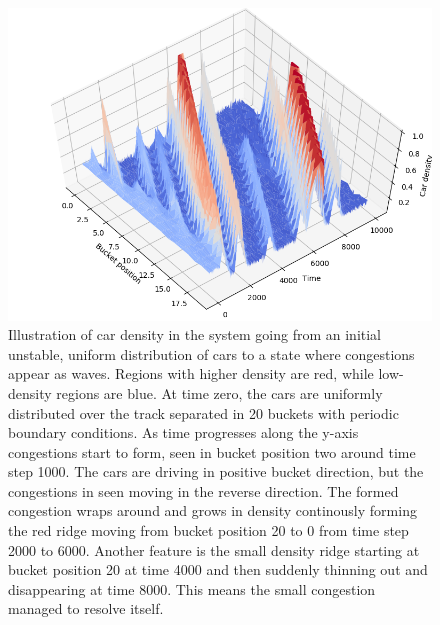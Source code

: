 \documentclass[11pt,a4paper,twocolumn]{article}
\begin{document}
\begin{figure}[t]     
      \centering
       \includegraphics[scale=0.65, trim={0cm 0cm 0cm 2cm}]{figs/side_view2.png}
       \caption{Illustration of car density in the system going from an initial unstable, uniform distribution of cars to a state where congestions appear as waves. Regions with higher density are red, while low-density regions are blue. At time zero, the cars are uniformly distributed over the track separated in 20 buckets with periodic boundary conditions. As time progresses along the y-axis congestions start to form, seen in bucket position two around time step 1000. The cars are driving in positive bucket direction, but the congestions in seen moving in the reverse direction. The formed congestion wraps around and grows in density continously forming the red ridge moving from bucket position 20 to 0 from time step 2000 to 6000. Another feature is the small density ridge starting at bucket position 20 at time 4000 and then suddenly thinning out and disappearing at time 8000. This means the small congestion managed to resolve itself. }
       \label{fig:phase_transition}
 \end{figure}
\end{document}
